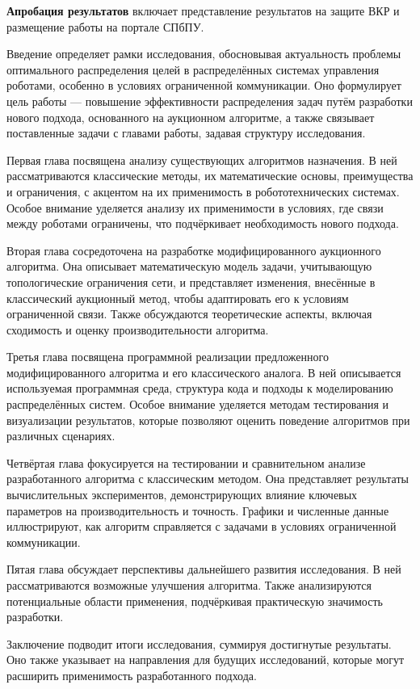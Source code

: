 \textbf{Апробация результатов} включает представление результатов на защите ВКР и размещение работы на портале СПбПУ.

Введение определяет рамки исследования, обосновывая актуальность проблемы оптимального распределения целей в распределённых системах управления роботами, особенно в условиях ограниченной коммуникации. Оно формулирует цель работы — повышение эффективности распределения задач путём разработки нового подхода, основанного на аукционном алгоритме, а также связывает поставленные задачи с главами работы, задавая структуру исследования.

Первая глава посвящена анализу существующих алгоритмов назначения. В ней рассматриваются классические методы, их математические основы, преимущества и ограничения, с акцентом на их применимость в робототехнических системах. Особое внимание уделяется анализу их применимости в условиях, где связи между роботами ограничены, что подчёркивает необходимость нового подхода.

Вторая глава сосредоточена на разработке модифицированного аукционного алгоритма. Она описывает математическую модель задачи, учитывающую топологические ограничения сети, и представляет изменения, внесённые в классический аукционный метод, чтобы адаптировать его к условиям ограниченной связи. Также обсуждаются теоретические аспекты, включая сходимость и оценку производительности алгоритма.

Третья глава посвящена программной реализации предложенного модифицированного алгоритма и его классического аналога. В ней описывается используемая программная среда, структура кода и подходы к моделированию распределённых систем. Особое внимание уделяется методам тестирования и визуализации результатов, которые позволяют оценить поведение алгоритмов при различных сценариях.

Четвёртая глава фокусируется на тестировании и сравнительном анализе разработанного алгоритма с классическим методом. Она представляет результаты вычислительных экспериментов, демонстрирующих влияние ключевых параметров на производительность и точность. Графики и численные данные иллюстрируют, как алгоритм справляется с задачами в условиях ограниченной коммуникации.

Пятая глава обсуждает перспективы дальнейшего развития исследования. В ней рассматриваются возможные улучшения алгоритма. Также анализируются потенциальные области применения, подчёркивая практическую значимость разработки.

Заключение подводит итоги исследования, суммируя достигнутые результаты. Оно также указывает на направления для будущих исследований, которые могут расширить применимость разработанного подхода.
